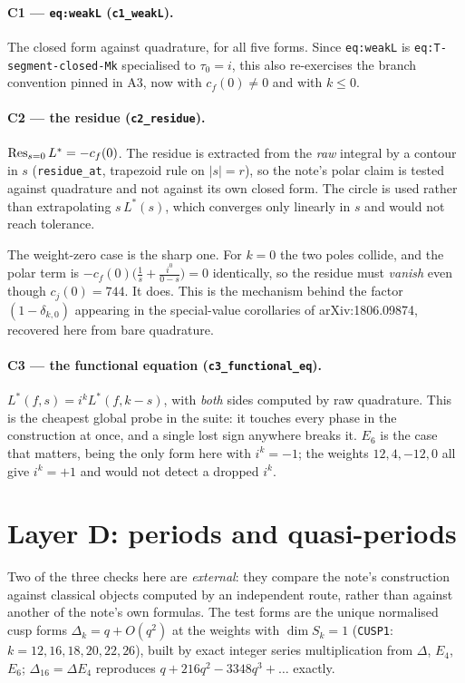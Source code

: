 \documentclass[11pt]{article}
\newcommand{\code}[1]{\texttt{#1}}
\begin{document}
\paragraph{C1 --- \code{eq:weakL} (\code{c1\_weakL}).}
The closed form against quadrature, for all five forms. Since \code{eq:weakL} is
\code{eq:T-segment-closed-Mk} specialised to $\tau_0=i$, this also re-exercises the branch
convention pinned in A3, now with $c_f(0)\neq0$ and with $k\le0$.

\paragraph{C2 --- the residue (\code{c2\_residue}).}
$\mathop{\rm Res}_{s=0}L^*=-c_f(0)$. The residue is extracted from the \emph{raw} integral by a
contour in $s$ (\code{residue\_at}, trapezoid rule on $|s|=r$), so the note's polar claim is
tested against quadrature and not against its own closed form. The circle is used rather than
extrapolating $s\,L^*(s)$, which converges only linearly in $s$ and would not reach tolerance.

The weight-zero case is the sharp one. For $k=0$ the two poles collide, and the polar term is
$-c_f(0)\big(\tfrac1s+\tfrac{i^0}{0-s}\big)=0$ identically, so the residue must \emph{vanish}
even though $c_j(0)=744$. It does. This is the mechanism behind the factor $(1-\delta_{k,0})$
appearing in the special-value corollaries of arXiv:1806.09874, recovered here from bare
quadrature.

\paragraph{C3 --- the functional equation (\code{c3\_functional\_eq}).}
$L^*(f,s)=i^kL^*(f,k-s)$, with \emph{both} sides computed by raw quadrature. This is the
cheapest global probe in the suite: it touches every phase in the construction at once, and a
single lost sign anywhere breaks it. $E_6$ is the case that matters, being the only form here
with $i^k=-1$; the weights $12,4,-12,0$ all give $i^k=+1$ and would not detect a dropped
$i^k$.

\section{Layer D: periods and quasi-periods}

Two of the three checks here are \emph{external}: they compare the note's construction against
classical objects computed by an independent route, rather than against another of the note's
own formulas. The test forms are the unique normalised cusp forms $\Delta_k=q+O(q^2)$ at the
weights with $\dim S_k=1$ (\code{CUSP1}: $k=12,16,18,20,22,26$), built by exact integer series
multiplication from $\Delta$, $E_4$, $E_6$; $\Delta_{16}=\Delta E_4$ reproduces
$q+216q^2-3348q^3+\dots$ exactly.
\end{document}
